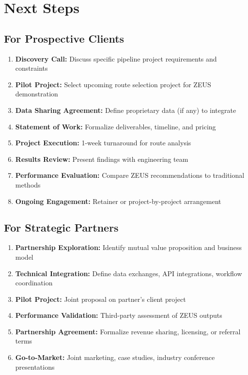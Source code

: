 \documentclass[11pt,letterpaper]{article}
\begin{document}
\newpage

\section{Next Steps}

\subsection{For Prospective Clients}

\begin{enumerate}[leftmargin=*]
    \item \textbf{Discovery Call:} Discuss specific pipeline project requirements and constraints
    \item \textbf{Pilot Project:} Select upcoming route selection project for ZEUS demonstration
    \item \textbf{Data Sharing Agreement:} Define proprietary data (if any) to integrate
    \item \textbf{Statement of Work:} Formalize deliverables, timeline, and pricing
    \item \textbf{Project Execution:} 1-week turnaround for route analysis
    \item \textbf{Results Review:} Present findings with engineering team
    \item \textbf{Performance Evaluation:} Compare ZEUS recommendations to traditional methods
    \item \textbf{Ongoing Engagement:} Retainer or project-by-project arrangement
\end{enumerate}

\subsection{For Strategic Partners}

\begin{enumerate}[leftmargin=*]
    \item \textbf{Partnership Exploration:} Identify mutual value proposition and business model
    \item \textbf{Technical Integration:} Define data exchanges, API integrations, workflow coordination
    \item \textbf{Pilot Project:} Joint proposal on partner's client project
    \item \textbf{Performance Validation:} Third-party assessment of ZEUS outputs
    \item \textbf{Partnership Agreement:} Formalize revenue sharing, licensing, or referral terms
    \item \textbf{Go-to-Market:} Joint marketing, case studies, industry conference presentations
\end{enumerate}
\end{document}
